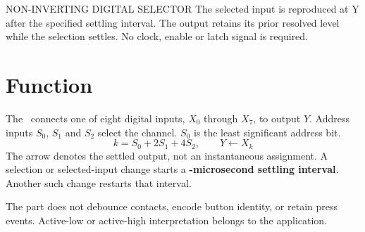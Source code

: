 \documentclass[10pt]{article}
\begin{document}
\begin{Notice}{NON-INVERTING DIGITAL SELECTOR}
The selected input is reproduced at Y after the specified settling interval. The output retains its prior resolved level while the selection settles. No clock, enable or latch signal is required.
\end{Notice}
\section*{Function}
\begin{minipage}[t]{.52\linewidth}
The \PartNumber\ connects one of eight digital inputs, $X_0$ through $X_7$, to output $Y$. Address inputs $S_0$, $S_1$ and $S_2$ select the channel. $S_0$ is the least significant address bit.
\[
 k = S_0 + 2S_1 + 4S_2,\qquad Y \leftarrow X_k
\]
The arrow denotes the settled output, not an instantaneous assignment. A selection or selected-input change starts a \textbf{\SettlingUs-microsecond settling interval}. Another such change restarts that interval.

The part does not debounce contacts, encode button identity, or retain press events. Active-low or active-high interpretation belongs to the application.
\end{minipage}\hfill
\begin{minipage}[t]{.43\linewidth}\centering\vspace{0pt}
\end{minipage}
\end{document}
